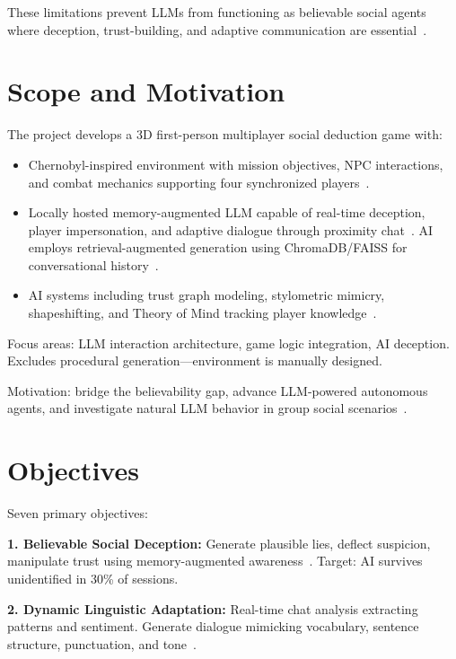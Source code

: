 These limitations prevent LLMs from functioning as believable social agents where deception, trust-building, and adaptive communication are essential~\cite{yoo2023,hagendorff2023}.

\section{Scope and Motivation}

The project develops a 3D first-person multiplayer social deduction game with:

\begin{itemize}
\item Chernobyl-inspired environment with mission objectives, NPC interactions, and combat mechanics supporting four synchronized players~\cite{barri2016,deng2018}.

\item Locally hosted memory-augmented LLM capable of real-time deception, player impersonation, and adaptive dialogue through proximity chat~\cite{hong2025}. AI employs retrieval-augmented generation using ChromaDB/FAISS for conversational history~\cite{chen2023,muludi2023}.

\item AI systems including trust graph modeling, stylometric mimicry, shapeshifting, and Theory of Mind tracking player knowledge~\cite{park2023ai,poje2023}.
\end{itemize}

Focus areas: LLM interaction architecture, game logic integration, AI deception. Excludes procedural generation—environment is manually designed. 

Motivation: bridge the believability gap, advance LLM-powered autonomous agents, and investigate natural LLM behavior in group social scenarios~\cite{zeng2023}.

\section{Objectives}

Seven primary objectives:

\textbf{1. Believable Social Deception:} Generate plausible lies, deflect suspicion, manipulate trust using memory-augmented awareness~\cite{yoo2023,danry2023}. Target: AI survives unidentified in 30\% of sessions.

\textbf{2. Dynamic Linguistic Adaptation:} Real-time chat analysis extracting patterns and sentiment. Generate dialogue mimicking vocabulary, sentence structure, punctuation, and tone~\cite{mikros2023,kolenbrander2023}.

